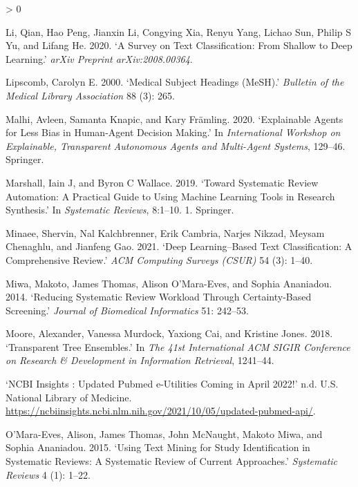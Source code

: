 \documentclass{article}
\newlength{\cslhangindent}
\newenvironment{CSLReferences}[2] %
 {%
  \setlength{\parindent}{0pt}
  \ifodd #1 \everypar{\setlength{\hangindent}{\cslhangindent}}\ignorespaces\fi
  \ifnum #2 > 0
  \setlength{\parskip}{#2\baselineskip}
  \fi
 }%
 {}
\begin{document}
\begin{CSLReferences}{1}{0}
\leavevmode\hypertarget{ref-li2020survey}{}%
Li, Qian, Hao Peng, Jianxin Li, Congying Xia, Renyu Yang, Lichao Sun,
Philip S Yu, and Lifang He. 2020. {`A Survey on Text Classification:
From Shallow to Deep Learning.'} \emph{arXiv Preprint arXiv:2008.00364}.

\leavevmode\hypertarget{ref-lipscomb2000medical}{}%
Lipscomb, Carolyn E. 2000. {`Medical Subject Headings (MeSH).'}
\emph{Bulletin of the Medical Library Association} 88 (3): 265.

\leavevmode\hypertarget{ref-malhi2020explainable}{}%
Malhi, Avleen, Samanta Knapic, and Kary Främling. 2020. {`Explainable
Agents for Less Bias in Human-Agent Decision Making.'} In
\emph{International Workshop on Explainable, Transparent Autonomous
Agents and Multi-Agent Systems}, 129--46. Springer.

\leavevmode\hypertarget{ref-marshall2015systematic}{}%
Marshall, Iain J, and Byron C Wallace. 2019. {`Toward Systematic Review
Automation: A Practical Guide to Using Machine Learning Tools in
Research Synthesis.'} In \emph{Systematic Reviews}, 8:1--10. 1.
Springer.

\leavevmode\hypertarget{ref-minaee2021deep}{}%
Minaee, Shervin, Nal Kalchbrenner, Erik Cambria, Narjes Nikzad, Meysam
Chenaghlu, and Jianfeng Gao. 2021. {`Deep Learning--Based Text
Classification: A Comprehensive Review.'} \emph{ACM Computing Surveys
(CSUR)} 54 (3): 1--40.

\leavevmode\hypertarget{ref-miwa2014reducing}{}%
Miwa, Makoto, James Thomas, Alison O'Mara-Eves, and Sophia Ananiadou.
2014. {`Reducing Systematic Review Workload Through Certainty-Based
Screening.'} \emph{Journal of Biomedical Informatics} 51: 242--53.

\leavevmode\hypertarget{ref-moore2018transparent}{}%
Moore, Alexander, Vanessa Murdock, Yaxiong Cai, and Kristine Jones.
2018. {`Transparent Tree Ensembles.'} In \emph{The 41st International
ACM SIGIR Conference on Research \& Development in Information
Retrieval}, 1241--44.

\leavevmode\hypertarget{ref-pubmedUpdate}{}%
{`NCBI Insights : Updated Pubmed e-Utilities Coming in April 2022!'}
n.d. U.S. National Library of Medicine.
\url{https://ncbiinsights.ncbi.nlm.nih.gov/2021/10/05/updated-pubmed-api/}.

\leavevmode\hypertarget{ref-o2015using}{}%
O'Mara-Eves, Alison, James Thomas, John McNaught, Makoto Miwa, and
Sophia Ananiadou. 2015. {`Using Text Mining for Study Identification in
Systematic Reviews: A Systematic Review of Current Approaches.'}
\emph{Systematic Reviews} 4 (1): 1--22.


\end{CSLReferences}
\end{document}
